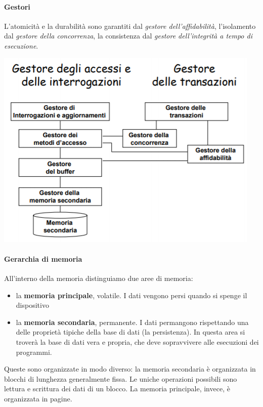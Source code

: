 \paragraph{Gestori}
L'atomicità e la durabilità sono garantiti dal \emph{gestore dell'affidabilità}, l'isolamento dal \emph{gestore della concorrenza}, la consistenza dal \emph{gestore dell'integrità a tempo di esecuzione}.
\begin{center}
	\includegraphics{images/133.PNG}
\end{center}
\paragraph{Gerarchia di memoria} All'interno della memoria distinguiamo due aree di memoria:
\begin{itemize}
	\item la \textbf{memoria principale}, volatile. I dati vengono persi quando si spenge il dispositivo
	\item la \textbf{memoria secondaria}, permanente. I dati permangono rispettando una delle proprietà tipiche della base di dati (la persistenza). In questa area si troverà la base di dati vera e propria, che deve sopravvivere alle esecuzioni dei programmi.
\end{itemize}
Queste sono organizzate in modo diverso: la memoria secondaria è organizzata in blocchi di lunghezza generalmente fissa. Le uniche operazioni possibili sono lettura e scrittura dei dati di un blocco. La memoria principale, invece, è organizzata in pagine. 
